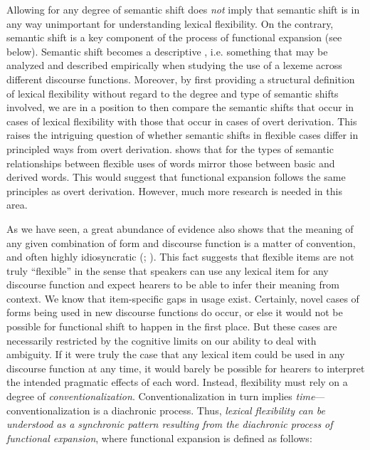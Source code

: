 Allowing for any degree of semantic shift does \emph{not} imply that semantic shift is in any way unimportant for understanding lexical flexibility. On the contrary, semantic shift is a key component of the process of functional expansion (see below). Semantic shift becomes a descriptive , i.e. something that may be analyzed and described empirically when studying the use of a lexeme across different discourse functions. Moreover, by first providing a structural definition of lexical flexibility without regard to the degree and type of semantic shifts involved, we are in a position to then compare the semantic shifts that occur in cases of lexical flexibility with those that occur in cases of overt derivation. This raises the intriguing question of whether semantic shifts in flexible cases differ in principled ways from overt derivation. \textcite[165]{Mithun2017} shows that for  the types of semantic relationships between flexible uses of words mirror those between basic and derived words. This would suggest that functional expansion follows the same principles as overt derivation. However, much more research is needed in this area.

As we have seen, a great abundance of evidence also shows that the meaning of any given combination of form and discourse function is a matter of convention, and often highly idiosyncratic (; ). This fact suggests that flexible items are not truly \enquote{flexible} in the sense that speakers can use any lexical item for any discourse function and expect hearers to be able to infer their meaning from context. We know that item-specific gaps in usage exist. Certainly, novel cases of forms being used in new discourse functions do occur, or else it would not be possible for functional shift to happen in the first place. But these cases are necessarily restricted by the cognitive limits on our ability to deal with ambiguity. If it were truly the case that any lexical item could be used in any discourse function at any time, it would barely be possible for hearers to interpret the intended pragmatic effects of each word. Instead, flexibility must rely on a degree of \emph{conventionalization}. Conventionalization in turn implies \emph{time}—conventionalization is a diachronic process. Thus, \emph{lexical flexibility can be understood as a synchronic pattern resulting from the diachronic process of functional expansion}, where functional expansion is defined as follows:

